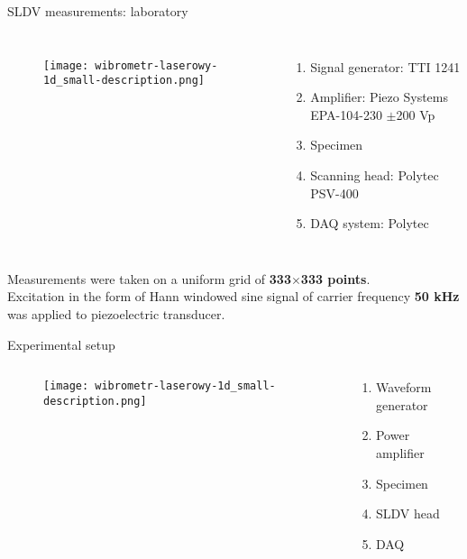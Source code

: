 \documentclass[10pt,aspectratio=169,dvipsnames]{beamer} %
\begin{document}
	\begin{frame}[t]{SLDV measurements: laboratory}
		\begin{columns}[T]
			\begin{figure}
				\texttt{[image: wibrometr-laserowy-1d\_small-description.png]}
			\end{figure}
			\begin{enumerate}
				\item Signal generator: TTI 1241 
				\item Amplifier: Piezo Systems EPA-104-230 $\pm$200 Vp
				\item Specimen
				\item Scanning head: Polytec PSV-400
				\item DAQ system: Polytec
			\end{enumerate}
		\end{columns}
		{\small
			Measurements were taken on a uniform grid of \textbf{333$\times$333 points}.\\
			Excitation in the form of Hann windowed sine signal of carrier frequency \textbf{50 kHz} was applied to piezoelectric transducer.}
	\end{frame}
	
			\begin{frame}{Experimental setup}
				\begin{columns}[T]
					\begin{column}[t]{0.55\textwidth}
						\begin{figure}
							\centering
							\texttt{[image: wibrometr-laserowy-1d\_small-description.png]}
						\end{figure}
					\end{column}
					\begin{column}[t]{0.4\textwidth}
						\begin{enumerate}
							\item Waveform generator
							\item Power amplifier	
							\item Specimen
							\item SLDV head
							\item DAQ
						\end{enumerate}
					\end{column}
				\end{columns}
			\end{frame}
	
\end{document}
